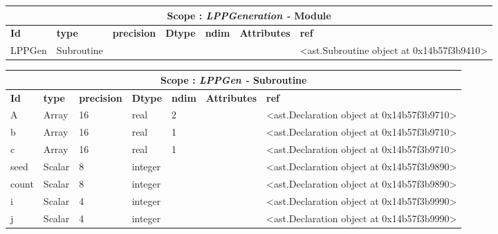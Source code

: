 \documentclass{report}
\begin{document}
 \vspace{1cm}

\begin{center}
\begin{longtable}{|p{3.5cm}|p{1.5cm}|p{1.5cm}|p{1.5cm}|p{1cm}|p{2cm}|p{4cm}| }
\hline
\multicolumn{7}{|c|}{\textbf{Scope : \qquad}  \textbf{\textit{LPPGeneration - }Module}}\\ 
\hline
\textbf{Id} & \textbf{type} & \textbf{precision} & \textbf{Dtype} & \textbf{ndim} & \textbf{Attributes} & \textbf{ref} \\\hline

LPPGen & Subroutine &  &  &  &  & <ast.Subroutine object at 0x14b57f3b9410> \\\hline

\end{longtable}
\end{center}

 \vspace{1cm}

\begin{center}
\begin{longtable}{|p{3.5cm}|p{1.5cm}|p{1.5cm}|p{1.5cm}|p{1cm}|p{2cm}|p{4cm}| }
\hline
\multicolumn{7}{|c|}{\textbf{Scope : \qquad}  \textbf{\textit{LPPGen - }Subroutine}}\\ 
\hline
\textbf{Id} & \textbf{type} & \textbf{precision} & \textbf{Dtype} & \textbf{ndim} & \textbf{Attributes} & \textbf{ref} \\\hline

A & Array & 16 & real & 2 &  & <ast.Declaration object at 0x14b57f3b9710> \\\hline

b & Array & 16 & real & 1 &  & <ast.Declaration object at 0x14b57f3b9710> \\\hline

c & Array & 16 & real & 1 &  & <ast.Declaration object at 0x14b57f3b9710> \\\hline

seed & Scalar & 8 & integer &  &  & <ast.Declaration object at 0x14b57f3b9890> \\\hline

count & Scalar & 8 & integer &  &  & <ast.Declaration object at 0x14b57f3b9890> \\\hline

i & Scalar & 4 & integer &  &  & <ast.Declaration object at 0x14b57f3b9990> \\\hline

j & Scalar & 4 & integer &  &  & <ast.Declaration object at 0x14b57f3b9990> \\\hline

\end{longtable}
\end{center}
\end{document}
